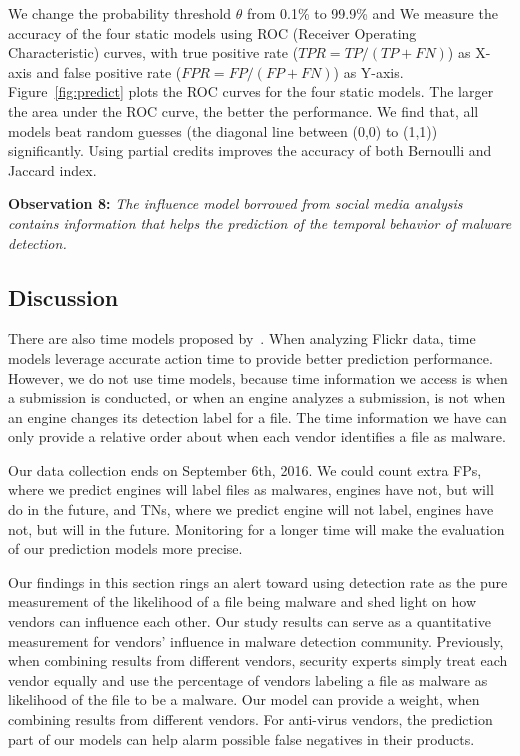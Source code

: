 

We change the probability threshold $\theta$ from 0.1\% to 99.9\% 
and 
We measure the accuracy of the four static models using ROC (Receiver Operating Characteristic) curves,
with true positive rate ($TPR = TP/(TP+FN)$) as X-axis
and false positive rate ($FPR = FP/(FP + FN)$) as Y-axis. 
Figure~\ref{fig:predict} plots the ROC curves for the four static models.
The larger the area under the ROC curve, the better the performance.
We find that, all models beat random guesses
(the diagonal line between (0,0) to (1,1)) significantly. 
Using partial credits improves the accuracy of both Bernoulli and Jaccard index.

{\bf Observation 8:} 
{\em The influence model borrowed from
social media analysis contains information
that helps the prediction of the temporal
behavior of malware detection. }

\subsection{Discussion}

There are also time models proposed by~\citet{Influence}.
When analyzing Flickr data, time models leverage accurate action time to provide better prediction performance. 
However, we do not use time models, 
because time information we access is when a submission is conducted, 
or when an engine analyzes a submission, 
is not when an engine changes its detection label for a file.
The time information we have can only provide a relative order about when each vendor identifies a file as malware.  

Our data collection ends on September 6th, 2016. 
We could count extra FPs, where we predict engines will label files as malwares, engines have not, but will do in the future, 
and TNs, where we predict engine will not label, engines have not, but will in the future. 
Monitoring \vt for a longer time will make the evaluation of our prediction models more precise. 


Our findings in this section rings an alert toward using detection rate as the pure measurement of the likelihood of a file being malware
and shed light on how vendors can influence each other.
Our study results can serve as a quantitative measurement for vendors' influence in malware detection community. 
Previously, when combining results from different vendors, 
security experts simply treat each vendor equally and use the percentage of 
vendors labeling a file as malware as likelihood of the file to be a malware. 
Our model can provide a weight, when combining results from different vendors.  
For anti-virus vendors, the prediction part of our models can help alarm possible false negatives in their products.
